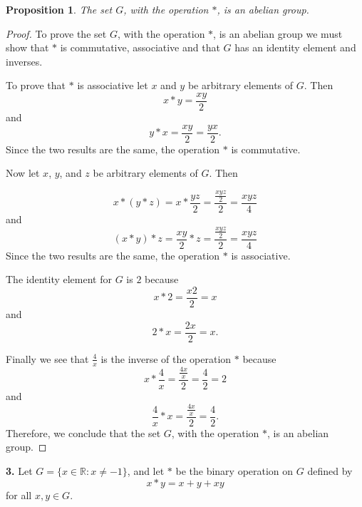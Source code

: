 \documentclass[12pt]{article}   %
\newtheorem*{proposition}{Proposition}  %
\begin{document}
\begin{proposition}
The set $G$, with the operation $\ast$, is an abelian group.
\end{proposition}
\begin{proof}
To prove the set $G$, with the operation $\ast$, is an abelian group we must show that $\ast$ is commutative, associative and that $G$ has an identity element and inverses.

To prove that $*$ is associative let $x$ and $y$ be arbitrary elements of $G$. Then
\begin{equation*}
x * y = \frac{xy}{2}
\end{equation*}
and
\begin{equation*}
y * x = \frac{xy}{2} = \frac{yx}{2}.
\end{equation*}
Since the two results are the same, the operation $\ast$ is commutative.

Now let $x$, $y$, and $z$ be arbitrary elements of $G$. Then

\begin{equation*}
x * (y * z) = x * \frac{yz}{2} = \frac{\frac{xyz}{2}}{2} = \frac{xyz}{4}
\end{equation*}
and
\begin{equation*}
(x * y) * z = \frac{xy}{2} * z = \frac{\frac{xyz}{2}}{2} = \frac{xyz}{4}
\end{equation*}
Since the two results are the same, the operation $*$ is associative.

The identity element for $G$ is $2$ because
\[
x * 2 =\frac{x2}{2} = x
\]
and
\[
2 * x = \frac{2x}{2} = x.
\]

Finally we see that $\frac{4}{x}$ is the inverse of the operation $\ast$ because
\[
x * \frac{4}{x} = \frac{\frac{4x}{x}}{2} = \frac{4}{2} = 2
\]
and
\[
\frac{4}{x} * x = \frac{\frac{4x}{x}}{2} = \frac{4}{2}.
\]
Therefore, we conclude that the set $G$, with the operation $\ast$, is an abelian group.
\end{proof}

\noindent\textbf{3.} \quad Let $G = \{x \in \mathbb{R}: x \neq -1\}$, and let $\ast$ be the binary operation on $G$ defined by
\begin{equation}
x * y = x + y +xy
\end{equation}
for all $x, y \in G$.
\end{document}
